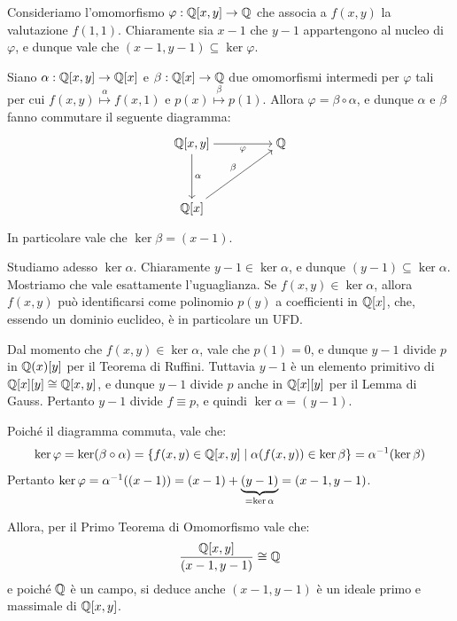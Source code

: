 \documentclass[11pt]{scrartcl}
\begin{document}
	\begin{remark}
		Consideriamo l'omomorfismo $\varphi : \mathbb Q[x, y] \to \mathbb Q$ che
		associa a $f(x, y)$ la valutazione $f(1, 1)$. Chiaramente sia
		$x-1$ che $y-1$ appartengono al nucleo di $\varphi$, e dunque
		vale che $(x-1, y-1) \subseteq \ker \varphi$. \medskip
		
		
		Siano $\alpha : \mathbb Q[x, y] \to \mathbb Q[x]$ e $\beta : \mathbb Q[x] \to \mathbb Q$
		due omomorfismi intermedi per $\varphi$ tali per cui
		$f(x, y) \overset{\alpha}{\mapsto} f(x, 1)$ e $p(x) \overset{\beta}{\mapsto} p(1)$. Allora $\varphi = \beta \circ \alpha$, e dunque $\alpha$ e $\beta$ fanno commutare il seguente diagramma:
		
		\[\begin{tikzcd}[cramped]
			{\mathbb{Q}[x, y]} && {\mathbb{Q}} \\
			\\
			{\mathbb{Q}[x]}
			\arrow["\alpha", from=1-1, to=3-1]
			\arrow["\beta", from=3-1, to=1-3]
			\arrow["\varphi"', from=1-1, to=1-3]
		\end{tikzcd}\]
		
		In particolare vale che $\ker \beta = (x-1)$. \medskip
		
		
		Studiamo adesso
		$\ker \alpha$. Chiaramente $y-1 \in \ker \alpha$, e dunque
		$(y-1) \subseteq \ker \alpha$. Mostriamo che vale esattamente
		l'uguaglianza. Se $f(x,y) \in \ker \alpha$, allora $f(x,y)$ può
		identificarsi come polinomio $p(y)$ a coefficienti in $\mathbb Q[x]$,
		che, essendo un dominio euclideo, è in particolare un UFD. \medskip
		
		
		Dal momento che $f(x, y) \in \ker \alpha$, vale che $p(1) = 0$,
		e dunque $y-1$ divide $p$ in $\mathbb Q(x)[y]$ per il Teorema di Ruffini.
		Tuttavia $y-1$ è un elemento primitivo di $\mathbb Q[x][y] \cong \mathbb Q[x, y]$,
		e dunque $y-1$ divide $p$ anche in $\mathbb Q[x][y]$ per il Lemma di Gauss.
		Pertanto $y-1$ divide $f \equiv p$, e quindi $\ker \alpha = (y-1)$. \medskip
		
		
		Poiché il diagramma commuta, vale che:
		\[ \ker \varphi = \ker (\beta \circ \alpha) = \{ f(x, y) \in \mathbb Q[x, y] \mid \alpha(f(x,y)) \in \ker \beta \} = \alpha^{-1}(\ker \beta) \]
		Pertanto $\ker \varphi = \alpha^{-1}((x-1)) = (x-1) + \underbrace{(y-1)}_{=\ker \alpha} = (x-1, y-1)$. \medskip
		
		
		Allora, per il Primo Teorema di Omomorfismo vale che:
		\[ \frac{\mathbb Q[x, y]}{(x-1, y-1)} \cong \mathbb Q \]
		e poiché $\mathbb Q$ è un campo, si deduce anche $(x-1, y-1)$ è un ideale primo
		e massimale di $\mathbb Q[x, y]$.
		
	\end{remark}
	
\end{document}
